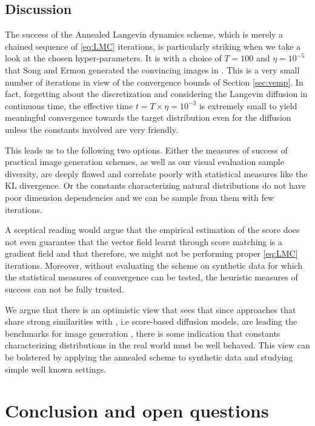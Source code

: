 \documentclass[11pt,twoside]{article}
\theoremstyle{definition}
\newcommand{\KL}{\text{KL}}
\begin{document}
\subsection{Discussion}

 
The success of the Annealed Langevin dynamics scheme, which is merely a chained sequence of \eqref{eq:LMC} iterations, is particularly striking when we take a look at the chosen hyper-parameters. It is with a choice of $T=100$ and $\eta = 10^{-5}$ that Song and Ermon generated the convincing images in \cite{song_generative_2019}. This is a very small number of iterations in view of the convergence bounds of Section \ref{sec:vemp}. In fact, forgetting about the discretization and considering the Langevin diffusion in continuous time, the effective time $t = T \times \eta = 10^{-3}$ is extremely small to yield meaningful convergence towards the target distribution even for the diffusion unless the constants involved are very friendly. 

This leads us to the following two options. Either the measures of success of practical image generation schemes, as well as our visual evaluation sample diversity, are deeply flawed and correlate poorly with statistical measures like the $\KL$ divergence. Or the constants characterizing natural distributions do not have poor dimension dependencies and we can be sample from them with few iterations.

A sceptical reading would argue that the empirical estimation of the score does not even guarantee that the vector field learnt through score matching is a gradient field and that therefore, we might not be performing proper \eqref{eq:LMC} iterations. Moreover, without evaluating the scheme on synthetic data for which the statistical measures of convergence can be tested, the heuristic measures of success can not be fully trusted.

We argue that there is an optimistic view that sees that since approaches that share strong similarities with \cite{song_generative_2019}, i.e score-based diffusion models, are leading the benchmarks for image generation \cite{noauthor_papers_nodate}, there is some indication that constants characterizing distributions in the real world must be well behaved. This view can be bolstered by applying the annealed scheme to synthetic data and studying simple well known settings.


\section{Conclusion and open questions}
\end{document}
